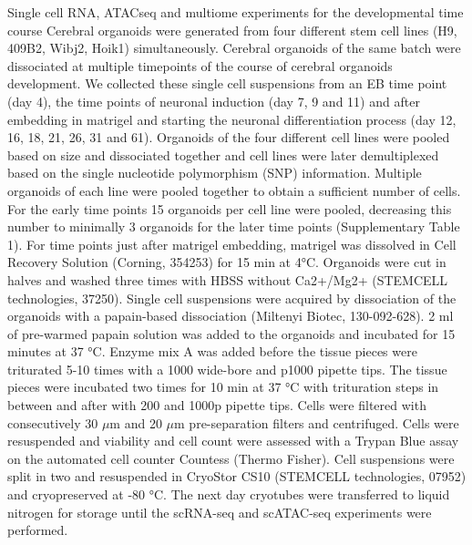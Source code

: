 Single cell RNA, ATACseq and multiome experiments for the developmental time course
Cerebral organoids were generated from four different stem cell lines (H9, 409B2, Wibj2, Hoik1) simultaneously. Cerebral organoids of the same batch were dissociated at multiple timepoints of the course of cerebral organoids development. We collected these single cell suspensions from an EB time point (day 4), the time points of neuronal induction (day 7, 9 and 11) and after embedding in matrigel and starting the neuronal differentiation process (day 12, 16, 18, 21, 26, 31 and 61). Organoids of the four different cell lines were pooled based on size and dissociated together and cell lines were later demultiplexed based on the single nucleotide polymorphism (SNP) information. Multiple organoids of each line were pooled together to obtain a sufficient number of cells. For the early time points 15 organoids per cell line were pooled, decreasing this number to minimally 3 organoids for the later time points (Supplementary Table 1). For time points just after matrigel embedding, matrigel was dissolved in Cell Recovery Solution (Corning, 354253)​​ for 15 min at 4°C. Organoids were cut in halves and washed three times with HBSS without Ca2+/Mg2+ (STEMCELL technologies, 37250). Single cell suspensions were acquired by dissociation of the organoids with a papain-based dissociation (Miltenyi Biotec, 130-092-628). 2 ml of pre-warmed papain solution was added to the  organoids and incubated for 15 minutes at 37 °C. Enzyme mix A was added before the tissue pieces were triturated 5-10 times with a 1000 wide-bore and p1000 pipette tips.  The tissue pieces were incubated two times for 10 min at 37 °C with trituration steps in between and after with 200 and 1000p pipette tips. Cells were filtered with consecutively 30 $\mu$m and 20 $\mu$m pre-separation filters and centrifuged. Cells were resuspended and viability and cell count were assessed with a Trypan Blue assay on the automated cell counter Countess (Thermo Fisher). Cell suspensions were split in two and resuspended in CryoStor CS10 (STEMCELL technologies, 07952) and cryopreserved at -80 °C. The next day cryotubes were transferred to liquid nitrogen for storage until the scRNA-seq and scATAC-seq experiments were performed.


